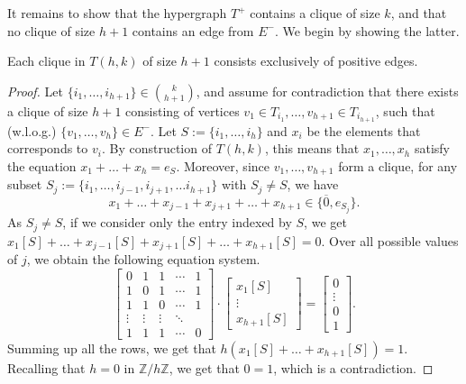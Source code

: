 \documentclass[a4paper,UKenglish,cleveref, autoref, thm-restate,numberwithinsect]{lipics-v2021}
\begin{document}
It remains to show that the hypergraph $T^+$ contains a clique of size $k$, and that no clique of size $h+1$ contains an edge from $E^-$.
We begin by showing the latter.
\begin{lemma}\label{lemma:no-negative-edges}
    Each clique in $T(h,k)$ of size $h+1$ consists exclusively of positive edges.
\end{lemma}
\begin{proof}
    Let $\{i_1,\dots, i_{h+1}\}\in \binom{k}{h+1}$, and assume for contradiction that there exists a clique of size $h+1$ consisting of vertices $v_1\in T_{i_1},\dots, v_{h+1}\in T_{i_{h+1}}$, such that (w.l.o.g.) $\{v_1,\dots, v_h\}\in E^-$.
    Let $S:=\{i_1,\dots, i_h\}$ and $x_i$ be the elements that corresponds to $v_i$. 
    By construction of $T(h,k)$, this means that $x_1,\dots, x_h$ satisfy the equation $x_1+\dots+x_h = e_S$. 
    Moreover, since $v_1,\dots, v_{h+1}$ form a clique, for any subset $S_j := \{i_1,\dots, i_{j-1}, i_{j+1}, \dots i_{h+1}\}$ with $S_j\neq S$, 
    we have
    \[
        x_1+\dots+ x_{j-1}+ x_{j+1} + \dots+ x_{h+1} \in \{\overline 0, e_{S_j}\}.
    \]
    As $S_j\neq S$, if we consider only the entry indexed by $S$, we get $x_1[S]+\dots+ x_{j-1}[S] + x_{j+1}[S] + \dots+ x_{h+1}[S] = 0$.
    Over all possible values of $j$, we obtain the following equation system.
    \begin{equation*}
        \begin{bmatrix} 0 & 1 & 1 & \cdots & 1\\ 1 & 0 & 1  & \cdots & 1 \\ 1 & 1 & 0 & \cdots & 1 \\ \vdots & \vdots & \vdots & \ddots \\ 1 & 1 & 1 & \cdots & 0\end{bmatrix} 
        \cdot 
        \begin{bmatrix} x_1[S] \\ \vdots \\ x_{h+1}[S] \end{bmatrix} = \begin{bmatrix} 0 \\ \vdots \\ 0 \\1 \end{bmatrix}.
    \end{equation*}
    Summing up all the rows, we get that
    \(
    h (x_1[S] +\dots + x_{h+1}[S]) = 1
    \).
    Recalling that $h=0$ in $\mathbb Z / h \mathbb Z$, we get that $0=1$, which is a contradiction.
\end{proof}
\end{document}
